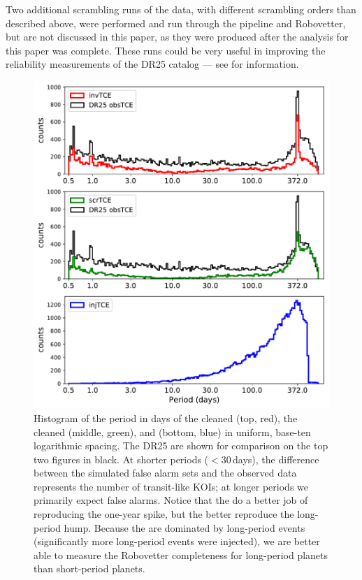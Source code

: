 Two additional scrambling runs of the data, with different scrambling orders than described above, were performed and run through the \Kepler{} pipeline and Robovetter, but are not discussed in this paper, as they were produced after the analysis for this paper was complete. These runs could be very useful in improving the reliability measurements of the DR25 catalog --- see \citealt{Coughlin2017a} for information.


\begin{figure}[hp]
 \begin{center}
  \includegraphics[width=\linewidth]{f2.pdf}
  \caption{Histogram of the period in days of the cleaned  (top, red), the cleaned  (middle, green), and  (bottom, blue) in uniform, base-ten logarithmic spacing. The DR25  are shown for comparison on the top two figures in black.  At shorter periods ($< 30$\,days), the difference between the simulated false alarm sets and the observed data represents the number of transit-like KOIs; at longer periods we primarily expect false alarms. Notice that the  do a better job of reproducing the one-year spike, but the  better reproduce the long-period hump. Because the  are dominated by long-period events (significantly more long-period events were injected), we are better able to measure the Robovetter completeness for long-period planets than short-period planets.}
  \label{f:simtces} 
 \end{center}
 \end{figure}



